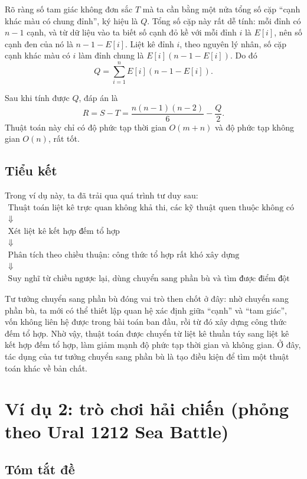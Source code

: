 \documentclass[11pt]{article}
\begin{document}
Rõ ràng số tam giác không đơn sắc \(T\) mà ta cần bằng một nửa tổng số
cặp ``cạnh khác màu có chung đỉnh'', ký hiệu là \(Q\). Tổng số cặp này
rất dễ tính: mỗi đỉnh có \(n-1\) cạnh, và từ dữ liệu vào ta biết số cạnh
đỏ kề với mỗi đỉnh \(i\) là \(E[i]\), nên số cạnh đen của nó là
\(n-1-E[i]\). Liệt kê đỉnh \(i\), theo nguyên lý nhân, số cặp cạnh khác
màu có \(i\) làm đỉnh chung là \(E[i](n-1-E[i])\). Do đó
\[
  Q=\sum_{i=1}^{n} E[i](n-1-E[i]).
\]

Sau khi tính được \(Q\), đáp án là
\[
  R=S-T=\frac{n(n-1)(n-2)}{6}-\frac{Q}{2}.
\]
Thuật toán này chỉ có độ phức tạp thời gian \(O(m+n)\) và độ phức tạp
không gian \(O(n)\), rất tốt.

\subsection{Tiểu kết}

Trong ví dụ này, ta đã trải qua quá trình tư duy sau:
\[
\begin{array}{c}
\text{Thuật toán liệt kê trực quan không khả thi, các kỹ thuật quen thuộc không có đất dụng võ}\\
\Downarrow\\
\text{Xét liệt kê kết hợp đếm tổ hợp}\\
\Downarrow\\
\text{Phân tích theo chiều thuận: công thức tổ hợp rất khó xây dựng}\\
\Downarrow\\
\text{Suy nghĩ từ chiều ngược lại, dùng chuyển sang phần bù và tìm được điểm đột phá.}
\end{array}
\]

Tư tưởng chuyển sang phần bù đóng vai trò then chốt ở đây: nhờ chuyển
sang phần bù, ta mới có thể thiết lập quan hệ xác định giữa ``cạnh'' và
``tam giác'', vốn không liên hệ được trong bài toán ban đầu, rồi từ đó
xây dựng công thức đếm tổ hợp. Nhờ vậy, thuật toán được chuyển từ liệt kê
thuần túy sang liệt kê kết hợp đếm tổ hợp, làm giảm mạnh độ phức tạp thời
gian và không gian. Ở đây, tác dụng của tư tưởng chuyển sang phần bù là
tạo điều kiện để tìm một thuật toán khác về bản chất.

\section{Ví dụ 2: trò chơi hải chiến (phỏng theo Ural 1212 Sea Battle)}

\subsection{Tóm tắt đề}
\end{document}
